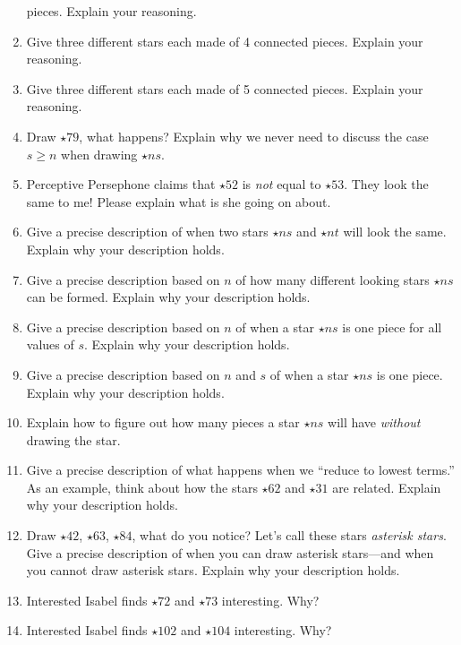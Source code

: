 \begin{enumerate}
  pieces. Explain your reasoning.
\item Give three different stars each made of 4 connected
  pieces. Explain your reasoning.
\item Give three different stars each made of 5 connected
  pieces. Explain your reasoning.
\item Draw $\star{7}{9}$, what happens? Explain why we never need to
  discuss the case $s\ge n$ when drawing $\star{n}{s}$.
\item Perceptive Persephone claims that $\star{5}{2}$ is \textit{not}
  equal to $\star{5}{3}$. They look the same to me! Please explain
  what is she going on about.
\item Give a precise description of when two stars $\star{n}{s}$ and
  $\star{n}{t}$ will look the same. Explain why your description
  holds.
\item Give a precise description based on $n$ of how many different
  looking stars $\star{n}{s}$ can be formed. Explain why your
  description holds.
\item Give a precise description based on $n$ of when a star
  $\star{n}{s}$ is one piece for all values of $s$. Explain why your
  description holds.
\item Give a precise description based on $n$ and $s$ of when a star
  $\star{n}{s}$ is one piece. Explain why your description holds.
\item Explain how to figure out how many pieces a star $\star{n}{s}$
  will have \textit{without} drawing the star.
\item Give a precise description of what happens when we ``reduce to
  lowest terms.'' As an example, think about how the stars
  $\star{6}{2}$ and $\star{3}{1}$ are related. Explain why your
  description holds.
\item Draw $\star{4}{2}$, $\star{6}{3}$, $\star{8}{4}$, what do you
  notice? Let's call these stars \textit{asterisk stars}. Give a precise
  description of when you can draw asterisk stars---and when you cannot
  draw asterisk stars. Explain why your description holds.
\item Interested Isabel finds $\star{7}{2}$ and $\star{7}{3}$
  interesting. Why?
\item Interested Isabel finds $\star{10}{2}$ and $\star{10}{4}$
  interesting. Why?
\end{enumerate}

\newpage










